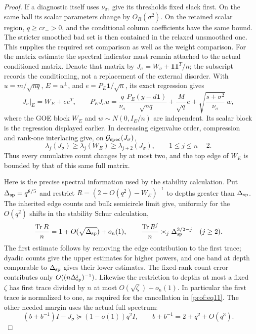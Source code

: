 \begin{proof}
If a diagnostic itself uses \(\nu_\sigma\), give its thresholds
fixed slack first. On the same ball its scalar parameters change
by \(O_R(\sigma^2)\). On the retained scalar region,
\(q\ge c r_->0\), and the conditional column coefficients have
the same bound. The stricter smoothed bad set is then contained in the relaxed
unsmoothed one. This supplies the required set comparison as well
as the weight comparison.
For the matrix estimate the spectral indicator must remain attached
to the actual conditioned matrix. Denote that matrix by
\(J_\sigma=W_\sigma+\mathbf1\mathbf1^T/n\); the subscript records
the conditioning, not a replacement of the external disorder.
With \(u=m/\sqrt{nq}\), \(E=u^\perp\), and
\(e=P_E\mathbf1/\sqrt n\), its exact regression gives
\[
 J_\sigma|_E=W_E+ee^T,\qquad
 P_EJ_\sigma u
 =\frac q{\nu_\sigma}\frac{P_E(y-d\mathbf1)}{\sqrt{nq}}
      +\frac M{\sqrt q}e
      +\sqrt{\frac{s+\sigma^2}{\nu_\sigma}}\,w,
\]
where the GOE block \(W_E\) and \(w\sim N(0,I_E/n)\) are
independent. Its scalar block is the regression displayed earlier.
In decreasing eigenvalue order, compression and rank-one interlacing
give, on \(\mathcal G_{\rm spec}(J_\sigma)\),
\[
 \lambda_j(J_\sigma)\ge\lambda_j(W_E)
                         \ge\lambda_{j+2}(J_\sigma),
 \qquad 1\le j\le n-2.
\]
Thus every cumulative count changes by at most two, and the top
edge of \(W_E\) is bounded by that of this same full matrix.

Here is the precise spectral information used by the stability
calculation. Put \(\Delta_{\rm sp}=q^{8/5}\) and restrict
\(R=(2+O(q^2)-W_E)^{-1}\) to depths greater than
\(\Delta_{\rm sp}\). The inherited edge counts and bulk
semicircle limit give, uniformly for the \(O(q^2)\) shifts in
the stability Schur calculation,
\[
 \frac{\operatorname{Tr}R}{n}
       =1+O(\sqrt{\Delta_{\rm sp}})+o_n(1),\qquad
 \frac{\operatorname{Tr}R^j}{n}
       \asymp_j\Delta_{\rm sp}^{3/2-j}\quad(j\ge2).
\]
The first estimate follows by removing the edge contribution to
the first trace; dyadic counts give the upper estimates for higher
powers, and one band at depth comparable to \(\Delta_{\rm sp}\)
gives their lower estimates. The fixed-rank count error contributes
only \(O((n\Delta_{\rm sp}^j)^{-1})\). Likewise the restriction
to depths at most a fixed \(\zeta\) has first trace divided by
\(n\) at most \(O(\sqrt\zeta)+o_n(1)\).
In particular the first trace is normalized to one, as required
for the cancellation in \eqref{prof:eq11}. The other needed margin
uses the actual full spectrum:
\[
 (b+b^{-1})I-J_\sigma\succeq(1-o(1))q^2I,
 \qquad b+b^{-1}=2+q^2+O(q^3).
\]


\end{proof}
